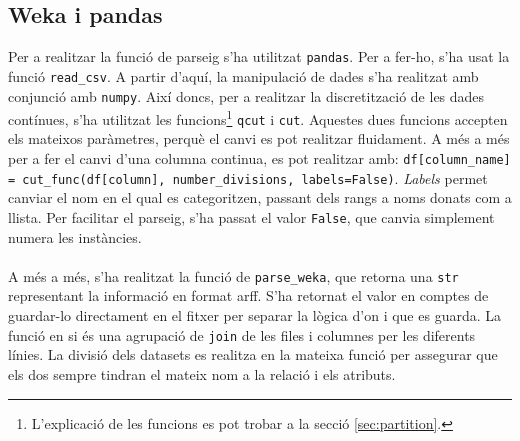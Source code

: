 \subsection{Weka i pandas}
	Per a realitzar la funció de parseig s'ha utilitzat \texttt{pandas}. Per a fer-ho, s'ha usat la funció
	\verb|read_csv|.  A partir d'aquí, la manipulació de dades s'ha realitzat amb conjunció amb 
	\texttt{numpy}. Així doncs, per a realitzar la discretització de les dades contínues, s'ha utilitzat les
	funcions\footnote{L'explicació de les funcions es pot trobar a la secció \ref{sec:partition}.} \texttt{qcut} i \texttt{cut}. Aquestes dues funcions
	accepten els mateixos paràmetres, perquè el canvi es pot realitzar fluidament. A més a més
	per a fer el canvi d'una columna continua, es pot realitzar amb:
	\verb|df[column_name] = cut_func(df[column], number_divisions, labels=False)|. 
	\textit{Labels} permet canviar el nom en el qual es categoritzen, passant dels rangs a noms
	donats com a llista. Per facilitar el parseig, s'ha passat el valor \texttt{False}, que canvia simplement numera les instàncies. \\
	\\
	A més a més, s'ha realitzat la funció de \verb|parse_weka|, que retorna una \texttt{str} 
	representant la informació en format arff. S'ha retornat el valor en comptes de guardar-lo directament
	en el fitxer per separar la lògica d'on i que es guarda. La funció en si és una agrupació de 
	\texttt{join} de les files i columnes per les diferents línies. La divisió dels datasets es realitza
	en la mateixa funció per assegurar que els dos sempre tindran el mateix nom a la relació i els
	atributs.
